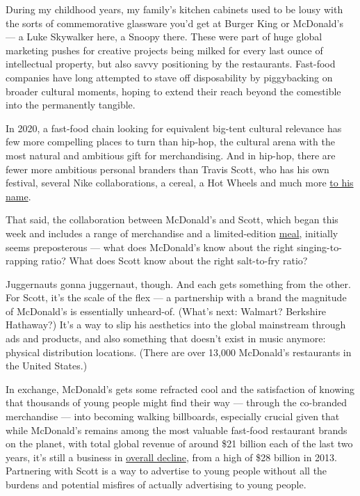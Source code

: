 During my childhood years, my family's kitchen cabinets used to be lousy
with the sorts of commemorative glassware you'd get at Burger King or
McDonald's --- a Luke Skywalker here, a Snoopy there. These were part of
huge global marketing pushes for creative projects being milked for
every last ounce of intellectual property, but also savvy positioning by
the restaurants. Fast-food companies have long attempted to stave off
disposability by piggybacking on broader cultural moments, hoping to
extend their reach beyond the comestible into the permanently tangible.

In 2020, a fast-food chain looking for equivalent big-tent cultural
relevance has few more compelling places to turn than hip-hop, the
cultural arena with the most natural and ambitious gift for
merchandising. And in hip-hop, there are fewer more ambitious personal
branders than Travis Scott, who has his own festival, several Nike
collaborations, a cereal, a Hot Wheels and much more
\href{https://www.complex.com/style/travis-scott-brand-collaboration-timeline}{to
his name}.

That said, the collaboration between McDonald's and Scott, which began
this week and includes a range of merchandise and a limited-edition
\href{https://www.mcdonalds.com/us/en-us/travis-scott-meal.html}{meal},
initially seems preposterous --- what does McDonald's know about the
right singing-to-rapping ratio? What does Scott know about the right
salt-to-fry ratio?

Juggernauts gonna juggernaut, though. And each gets something from the
other. For Scott, it's the scale of the flex --- a partnership with a
brand the magnitude of McDonald's is essentially unheard-of. (What's
next: Walmart? Berkshire Hathaway?) It's a way to slip his aesthetics
into the global mainstream through ads and products, and also something
that doesn't exist in music anymore: physical distribution locations.
(There are over 13,000 McDonald's restaurants in the United States.)

In exchange, McDonald's gets some refracted cool and the satisfaction of
knowing that thousands of young people might find their way --- through
the co-branded merchandise --- into becoming walking billboards,
especially crucial given that while McDonald's remains among the most
valuable fast-food restaurant brands on the planet, with total global
revenue of around \$21 billion each of the last two years, it's still a
business in
\href{https://www.macrotrends.net/stocks/charts/MCD/mcdonalds/revenue}{overall
decline}, from a high of \$28 billion in 2013. Partnering with Scott is
a way to advertise to young people without all the burdens and potential
misfires of actually advertising to young people.

